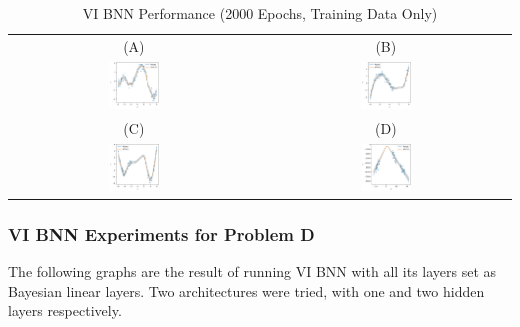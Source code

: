 \documentclass[conference]{IEEEtran}
\begin{document}
\begin{table}[H]
\centering
\begin{tabular}{cc}
(A) & (B)\\
\includegraphics[width=0.21\textwidth]{images/vi_bnn--problem_A--sb--2000_epochs.png} & \includegraphics[width=0.21\textwidth]{images/vi_bnn--problem_B--sb--2000_epochs.png}\\
(C) & (D)\\
\includegraphics[width=0.21\textwidth]{images/vi_bnn--problem_C--sb--2000_epochs.png} & \includegraphics[width=0.21\textwidth]{images/vi_bnn--problem_D--sb--2000_epochs.png}
\end{tabular}
\caption{VI BNN Performance (2000 Epochs, Training Data Only)}
\label{tb2:table_of_figures}
\end{table}

\subsubsection{VI BNN Experiments for Problem D}
The following graphs are the result of running VI BNN with all its layers set as Bayesian linear layers. Two architectures were tried, with one and two hidden layers respectively.
\end{document}

